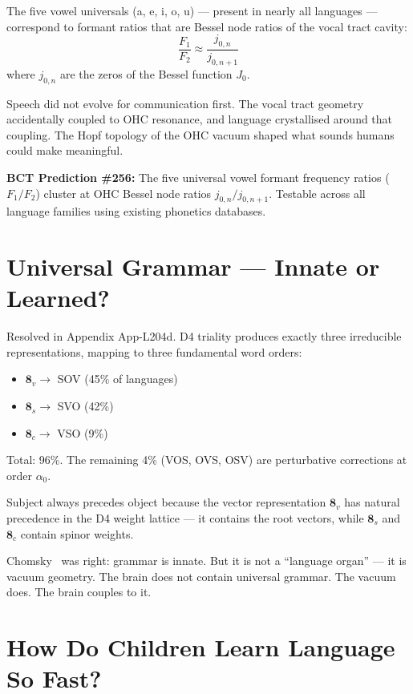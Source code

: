 \documentclass[aps,prl,twocolumn,superscriptaddress]{revtex4-2}
\begin{document}
The five vowel universals (a, e, i, o, u) --- present in nearly all languages --- correspond to formant ratios that are Bessel node ratios of the vocal tract cavity:
\begin{equation}
\frac{F_1}{F_2} \approx \frac{j_{0,n}}{j_{0,n+1}}
\end{equation}
where $j_{0,n}$ are the zeros of the Bessel function $J_0$.

Speech did not evolve for communication first. The vocal tract geometry accidentally coupled to OHC resonance, and language crystallised around that coupling. The Hopf topology of the OHC vacuum shaped what sounds humans could make meaningful.

\textbf{BCT Prediction \#256:} The five universal vowel formant frequency ratios ($F_1/F_2$) cluster at OHC Bessel node ratios $j_{0,n}/j_{0,n+1}$. Testable across all language families using existing phonetics databases.

\section{Universal Grammar --- Innate or Learned?}

Resolved in Appendix App-L204d. D4 triality produces exactly three irreducible representations, mapping to three fundamental word orders:
\begin{itemize}
\item $\mathbf{8}_v \to$ SOV (45\% of languages)
\item $\mathbf{8}_s \to$ SVO (42\%)
\item $\mathbf{8}_c \to$ VSO (9\%)
\end{itemize}
Total: 96\%. The remaining 4\% (VOS, OVS, OSV) are perturbative corrections at order $\alpha_0$.

Subject always precedes object because the vector representation $\mathbf{8}_v$ has natural precedence in the D4 weight lattice --- it contains the root vectors, while $\mathbf{8}_s$ and $\mathbf{8}_c$ contain spinor weights.

Chomsky~\cite{Chomsky1965} was right: grammar is innate. But it is not a ``language organ'' --- it is vacuum geometry. The brain does not contain universal grammar. The vacuum does. The brain couples to it.

\section{How Do Children Learn Language So Fast?}
\end{document}

